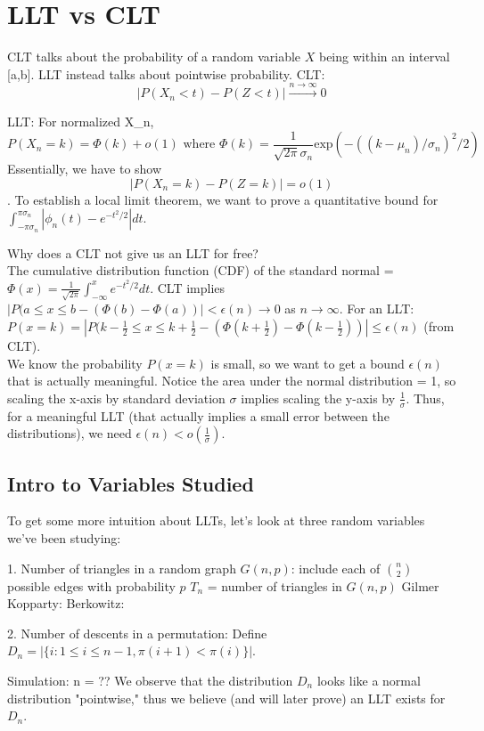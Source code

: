 \documentclass{article}
\newcommand{\p}[1]{\left(#1\right)}
\newcommand{\f}[2]{\frac{#1}{#2}}
\newcommand{\abs}[1]{\left\lvert#1\right\rvert}
\begin{document}
	\section*{LLT vs CLT}
		CLT talks about the probability of a random variable $X$ being within an interval [a,b].
		LLT instead talks about pointwise probability.
		CLT: 
\[ \abs{P(X_n < t) - P(Z < t)} \xrightarrow{n \to \infty} 0 \]

LLT: For normalized X_n,
\[ P(X_n = k) = \Phi(k) + o(1) \text{ where } \Phi(k) = \f{1}{\sqrt{2\pi}\sigma_n} \mathrm{exp}\p{-((k-\mu_n)/\sigma_n)^2/2} \]
		Essentially, we have to show \[ \abs{P(X_n = k) - P(Z = k) }=  o(1)\].
To establish a local limit theorem, we want to prove a quantitative bound for $\int_{-\pi\sigma_n}^{\pi\sigma_n} \abs{\phi_n(t) - e^{-t^2/2}} dt$.		
		
		Why does a CLT not give us an LLT for free? \\
		The cumulative distribution function (CDF) of the standard normal = $\Phi(x) = \frac{1}{\sqrt{2\pi}} \int_{-\infty}^{x} e^{-t^2/2} dt$.
		CLT implies $\abs{P(a\leq x\leq b - (\Phi(b) - \Phi(a))} < \epsilon(n) \rightarrow 0$ as $n \rightarrow \infty$.
		For an LLT: $P(x = k) = \abs{P(k-\frac{1}{2} \leq x \leq k+\frac{1}{2} - (\Phi(k+\frac{1}{2}) - \Phi(k-\frac{1}{2}))} \leq \epsilon(n)$ (from CLT). \\
		We know the probability $P(x=k)$ is small, so we want to get a bound $\epsilon(n)$ that is actually meaningful.
		Notice the area under the normal distribution = 1, so scaling the x-axis by standard deviation $\sigma$ implies scaling the y-axis by $\frac{1}{\sigma}$. Thus, for a meaningful LLT (that actually implies a small error between the distributions), we need $\epsilon(n) < o(\frac{1}{\sigma})$. 
	
		\subsection*{Intro to Variables Studied}
		To get some more intuition about LLTs, let's look at three random variables we've been studying:
		
		1. Number of triangles in a random graph $G(n,p)$: include each of $n\choose2$ possible edges with probability $p$
		$T_n$ = number of triangles in $G(n,p)$
		Gilmer Kopparty:
		Berkowitz:
		
		2. Number of descents in a permutation:
		Define $D_n = \abs{\{i:1 \leq i \leq n-1, \pi(i+1) < \pi(i) \}}$.
		
		Simulation: n = ?? 
		We observe that the distribution $D_n$ looks like a normal distribution "pointwise," thus we believe (and will later prove) an LLT exists for $D_n$. 
		
\end{document}
